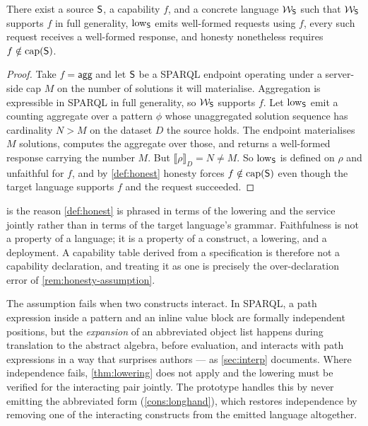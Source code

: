 \begin{proposition}
\label{prop:under}
There exist a source $\mathsf{S}$, a capability $f$, and a concrete language
$\mathcal{W}_{\mathsf{S}}$ such that $\mathcal{W}_{\mathsf{S}}$ supports $f$ in full
generality, $\mathrm{low}_{\mathsf{S}}$ emits well-formed requests using $f$, every such
request receives a well-formed response, and honesty nonetheless requires
$f \notin \mathrm{cap}(\mathsf{S})$.
\end{proposition}

\begin{proof}
Take $f = \textsf{agg}$ and let $\mathsf{S}$ be a SPARQL endpoint operating under a
server-side cap $M$ on the number of solutions it will materialise. Aggregation
is expressible in SPARQL in full generality, so $\mathcal{W}_{\mathsf{S}}$ supports
$f$. Let $\mathrm{low}_{\mathsf{S}}$ emit a counting aggregate over a pattern $\phi$ whose
unaggregated solution sequence has cardinality $N > M$ on the dataset $D$ the
source holds. The endpoint materialises $M$ solutions, computes the aggregate
over those, and returns a well-formed response carrying the number $M$. But
$\llbracket \rho \rrbracket_D = N \neq M$. So $\mathrm{low}_{\mathsf{S}}$ is defined on $\rho$
and unfaithful for $f$, and by \cref{def:honest} honesty forces
$f \notin \mathrm{cap}(\mathsf{S})$ even though the target language supports $f$ and the
request succeeded.
\end{proof}

 is the reason \cref{def:honest} is phrased in terms of the
lowering and the service jointly rather than in terms of the target language's
grammar. Faithfulness is not a property of a language; it is a property of a
construct, a lowering, and a deployment. A capability table derived from a
specification is therefore not a capability declaration, and treating it as one
is precisely the over-declaration error of \cref{rem:honesty-assumption}.

\begin{remark}
\label{rem:independence-fails}
The assumption fails when two constructs interact. In SPARQL, a path expression
inside a pattern and an inline value block are formally independent positions,
but the \emph{expansion} of an abbreviated object list happens during
translation to the abstract algebra, before evaluation, and interacts with
path expressions in a way that surprises authors --- as \cref{sec:interp}
documents. Where independence fails, \cref{thm:lowering} does not apply and the
lowering must be verified for the interacting pair jointly. The prototype
handles this by never emitting the abbreviated form (\cref{cons:longhand}),
which restores independence by removing one of the interacting constructs from
the emitted language altogether.
\end{remark}

